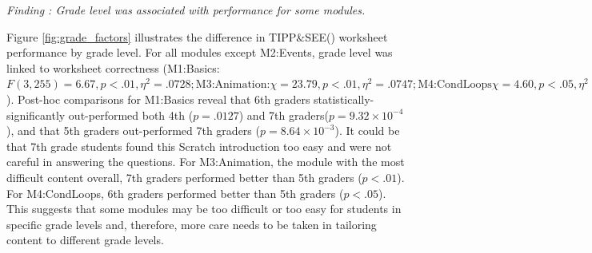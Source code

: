 \documentclass[sigconf,manuscript,review,anonymous]{acmart} %
\def\ts{TIPP\&SEE}
\begin{document}
\textit{Finding : Grade level was associated with performance for some modules.}

Figure \ref{fig:grade_factors} illustrates the difference in \ts() worksheet performance by grade level. For all modules except M2:Events, grade level was linked to worksheet correctness (M1:Basics:\begin{math}F(3, 255)=6.67, p<.01, \eta^2=.0728; \text{M3:Animation:}\chi=23.79, p<.01, \eta^2=.0747; \text{M4:CondLoops} \chi=4.60, p<.05, \eta^2=.0118\end{math}). Post-hoc comparisons for M1:Basics reveal that 6th graders statistically-significantly out-performed both 4th (\begin{math}p=.0127\end{math}) and 7th graders(\begin{math}p=9.32\times10^{-4}\end{math}), and that 5th graders out-performed 7th graders (\begin{math}p=8.64\times10^{-3}\end{math}). It could be that 7th grade students found this Scratch introduction too easy and were not careful in answering the questions. For M3:Animation, the module with the most difficult content overall, 7th graders performed better than 5th graders (\begin{math}p<.01\end{math}). For M4:CondLoops, 6th graders performed better than 5th graders (\begin{math}p<.05\end{math}). This suggests that some modules may be too difficult or too easy for students in specific grade levels and, therefore, more care needs to be taken in tailoring content to different grade levels.
\end{document}
